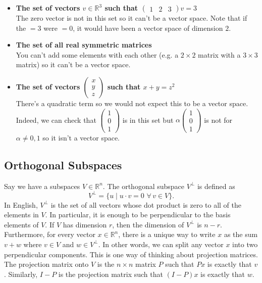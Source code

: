 \documentclass[11pt]{article}
\theoremstyle{plain} %
\theoremstyle{definition}
\theoremstyle{remark}
\begin{document}
\begin{itemize}
\item \textbf{The set of vectors $v\in \mathbb{R}^3$ such that $\begin{pmatrix}1 & 2 & 3\end{pmatrix}v = 3$}\\
The zero vector is not in this set so it can't be a vector space. Note that if the $=3$ were $=0$, it would have been a vector space of dimension $2$.

\item \textbf{The set of all real symmetric matrices}\\
You can't add some elements with each other (e.g. a $2\times 2$ matrix with a $3\times 3$ matrix) so it can't be a vector space.

\item \textbf{The set of vectors $\begin{pmatrix}x\\y\\z\end{pmatrix}$ such that $x+y = z^2$}\\
There's a quadratic term so we would not expect this to be a vector space. Indeed, we can check that $\begin{pmatrix}1\\0\\1\end{pmatrix}$ is in this set but $\alpha \begin{pmatrix}1\\0\\1\end{pmatrix}$ is not for $\alpha \neq 0, 1$ so it isn't a vector space.
\end{itemize}

\subsection{Orthogonal Subspaces}

Say we have a subspaces $V \in \mathbb{R}^n$. The orthogonal subspace $V^{\perp}$ is defined as $$V^{\perp} = \{u \mid u \cdot v = 0 \,\,\forall\, v \in V\}.$$ In English, $V^{\perp}$ is the set of all vectors whose dot product is zero to all of the elements in $V$. In particular, it is enough to be perpendicular to the basis elements of $V$. If $V$ has dimension $r$, then the dimension of $V^{\perp}$ is $n-r$. Furthermore, for every vector $x \in \mathbb{R}^n$, there is a unique way to write $x$ as the sum $v+w$ where $v\in V$ and $w \in V^{\perp}$. In other words, we can split any vector $x$ into two perpendicular components. This is one way of thinking about projection matrices. The projection matrix onto $V$ is the $n\times n$ matrix $P$ such that $Px$ is exactly that $v$. Similarly, $I-P$ is the projection matrix such that $(I-P)x$ is exactly that $w$.
\end{document}
